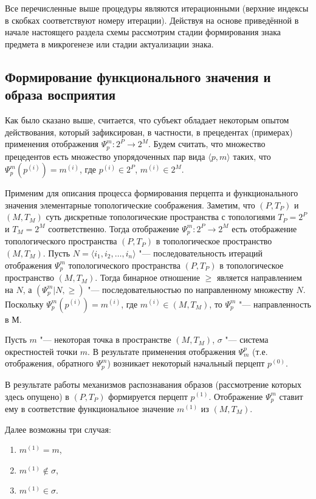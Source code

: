 Все перечисленные выше процедуры являются итерационными (верхние индексы в скобках соответствуют номеру итерации). Действуя на основе приведённой в начале настоящего раздела схемы рассмотрим стадии формирования знака предмета в микрогенезе или стадии актуализации знака.

\subsection{Формирование функционального значения и образа восприятия} 

Как было сказано выше, считается, что субъект обладает некоторым опытом действования, который зафиксирован, в частности, в прецедентах (примерах) применения отображения $\Psi_p^m:2^P\rightarrow 2^M$. Будем считать, что множество прецедентов есть множество упорядоченных пар вида $\langle p,m\rangle$ таких, что $\Psi_p^m(p^{(i)})=m^{(i)}$, где $p^{(i)}\in 2^P$, $m^{(i)}\in 2^M$.

Применим для описания процесса формирования перцепта и функционального значения элементарные топологические соображения. Заметим, что $(P, T_P)$ и $(M, T_M)$ суть дискретные топологические пространства с топологиями $T_P=2^P$ и $T_M=2^M$ соответственно. Тогда отображение $\Psi_p^m: 2^P\rightarrow 2^M$ есть отображение топологического пространства $(P, T_P)$ в топологическое пространство $(M, T_M)$. Пусть $N=\langle i_1,i_2,\dots,i_n\rangle$ "--- последовательность итераций отображения $\Psi_p^m$ топологического пространства $(P, T_P)$ в топологическое пространство $(M, T_M)$. Тогда бинарное отношение $\geqslant$ является направлением на $N$, а $(\Psi_p^m | N, \geqslant)$ "--- последовательностью по направленному множеству $N$. Поскольку $\Psi_p^m(p^{(i)})=m^{(i)}$, где $m^{(i)}\in (M,T_M)$, то $\Psi_p^m$  "--- направленность в $М$.

Пусть $m$ "--- некоторая точка в пространстве $(M,T_M)$, $\sigma$ "--- система окрестностей точки $m$. В результате применения отображения $\Psi_m^p$ (т.е. отображения, обратного $\Psi_p^m$) возникает некоторый начальный перцепт $p^{(0)}$.

В результате работы механизмов распознавания образов (рассмотрение которых здесь опущено) в $(P,T_P)$ формируется перцепт $p^{(1)}$. Отображение $\Psi_p^m$ ставит ему в соответствие функциональное значение $m^{(1)}$ из $(M,T_M)$.

Далее возможны три случая:
\begin{enumerate}
	\item\label{choise_1} $m^{(1)}=m$,
	\item\label{choise_2} $m^{(1)}\not\in\sigma$,
	\item\label{choise_3} $m^{(1)}\in\sigma$.
\end{enumerate}

